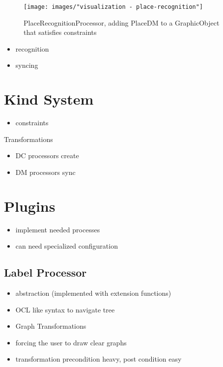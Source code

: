 \begin{figure}
  \centering
  \texttt{[image: images/"visualization - place-recognition"]}
  \caption{PlaceRecognitionProcessor, adding PlaceDM to a GraphicObject that satisfies constraints}
  \label{fig:place-recognition}
\end{figure}




\begin{itemize}
  \item recognition
  \item syncing
\end{itemize}





\section{Kind System}
\begin{itemize}
  \item constraints
\end{itemize}

Transformations

\begin{itemize}
  \item DC processors create
  \item DM processors sync
\end{itemize}

\section{Plugins}
\begin{itemize}
  \item implement needed processes
  \item can need specialized configuration
\end{itemize}
\subsection{Label Processor}







   


\begin{itemize}
  \item abstraction (implemented with extension functions)
  \item OCL like syntax to navigate tree
  \item Graph Transformations 
  \item forcing the user to draw clear graphs
  \item transformation precondition heavy, post condition easy
\end{itemize}
